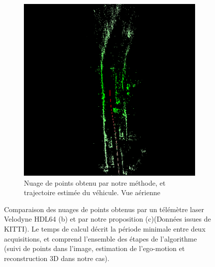 \begin{figure}[h]
\begin{center}
\begin{subfigure}[t]{0.48\textwidth}
			\includegraphics[width=\textwidth]{Chapter4/graphics/KITTI_SLAM_1.png} 
			\caption{Nuage de points obtenu par notre méthode, et trajectoire estimée du véhicule. Vue aérienne}
		\end{subfigure}	
		
		\caption{Comparaison des nuages de points obtenus par un télémètre laser Velodyne HDL64 (b) et par notre proposition (c)(Données issues de KITTI). Le temps de calcul décrit la période minimale entre deux acquisitions, et comprend l'ensemble des étapes  de l'algorithme (suivi de points dans l'image, estimation de l'ego-motion et reconstruction 3D dans notre cas).}
		\label{fig:ch4_comparaison_velodyne}
	\end{center}
\end{figure}

